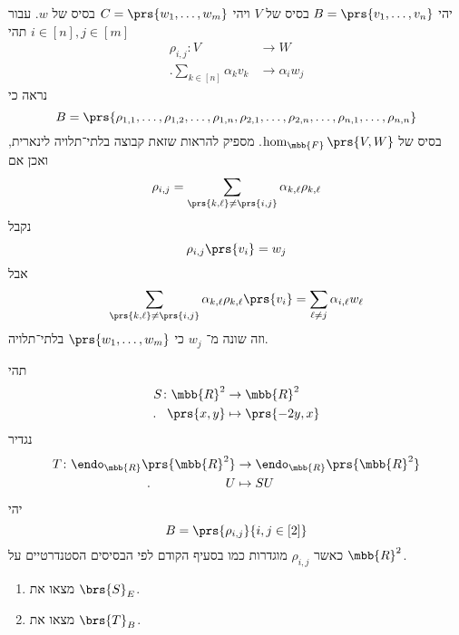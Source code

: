 \documentclass[a4paper,10pt,oneside,openany]{article}
\begin{document}
\begin{solution}
יהי
$B = \prs{v_1, \ldots, v_n}$
בסיס של
$V$
ויהי
$C = \prs{w_1, \ldots, w_m}$
בסיס של
$w$.
עבור
$i \in [n], j \in [m]$
תהי
\begin{align*}
\rho_{i,j} \colon V &\to W \\
\text{.} \sum_{k \in [n]} \alpha_k v_k &\to \alpha_i w_j
\end{align*}
נראה כי
\[B = \prs{\rho_{1,1}, \ldots, \rho_{1,2}, \ldots, \rho_{1,n}, \rho_{2,1}, \ldots, \rho_{2,n}, \ldots, \rho_{n,1}, \ldots, \rho_{n,n}}\]
בסיס של
$\hom_{\mbb{F}}\prs{V,W}$.
מספיק להראות שזאת קבוצה בלתי־תלויה לינארית, ואכן אם
\[\rho_{i,j} = \sum_{\prs{k,\ell} \neq \prs{i,j}} \alpha_{k,\ell} \rho_{k,\ell}\]
נקבל
\[\rho_{i,j}\prs{v_i} = w_j\]
אבל
\[\sum_{\prs{k,\ell} \neq \prs{i,j}} \alpha_{k,\ell} \rho_{k,\ell} \prs{v_i} = \sum_{\ell \neq j} \alpha_{i,\ell} w_\ell\]
וזה שונה מ־%
$w_j$
כי
$\prs{w_1, \ldots, w_m}$
בלתי־תלויה.
\end{solution}

\begin{exercise}
תהי
\begin{align*}
S \colon \mbb{R}^2 &\to \mbb{R}^2 \\
\text{.} \hphantom{la} \prs{x,y} &\mapsto \prs{-2y, x}
\end{align*}
נגדיר
\begin{align*}
T \colon \endo_{\mbb{R}}\prs{\mbb{R}^2} &\to \endo_{\mbb{R}}\prs{\mbb{R}^2} \\
\text{.} \hphantom{lalalalalallaa} U &\mapsto SU
\end{align*}
יהי
\[B = \prs{\rho_{i,j}}{i,j \in [2]}\]
כאשר
$\rho_{i,j}$
מוגדרות כמו בסעיף הקודם לפי הבסיסים הסטנדרטיים על
$\mbb{R}^2$.
\begin{enumerate}
\item מצאו את
$\brs{S}_E$.
\item מצאו את
$\brs{T}_B$.
\end{enumerate}
\end{exercise}
\end{document}
